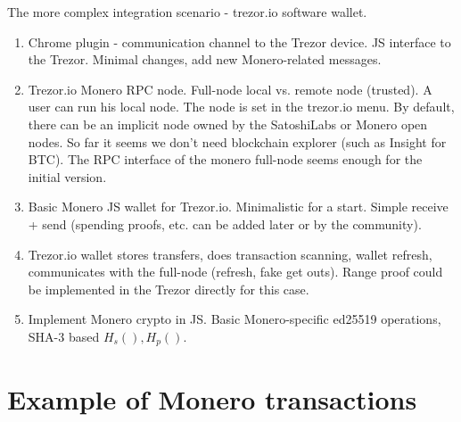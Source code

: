 \documentclass[]{article}
\begin{document}
The more complex integration scenario - trezor.io software wallet.
\begin{enumerate}
	\item Chrome plugin - communication channel to the Trezor device. 
	JS interface to the Trezor. Minimal changes, add new Monero-related messages.
	
	\item Trezor.io Monero RPC node. Full-node local vs. remote node (trusted). A user can run his local node. The node is set in the trezor.io menu. By default, there can be an implicit node owned by the SatoshiLabs or Monero open nodes. So far it seems we don't need blockchain explorer (such as Insight for BTC). The RPC interface of the monero full-node seems enough for the initial version.
	
	\item Basic Monero JS wallet for Trezor.io. Minimalistic for a start. Simple receive + send (spending proofs, etc. can be added later or by the community). 
	
	\item Trezor.io wallet stores transfers, does transaction scanning, wallet refresh, communicates with the full-node (refresh, fake get outs). Range proof could be implemented in the Trezor directly for this case. 
	
	\item Implement Monero crypto in JS. Basic Monero-specific ed25519 operations, SHA-3 based $H_s(), H_p()$.
	
\end{enumerate}


%



\appendix
\section{Example of Monero transactions}

\end{document}
